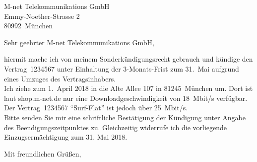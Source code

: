 \documentclass[a4paper, 12pt, KOMAold]{scrlttr2}
\newcommand{\Empfaenger}{M-net Telekommunikations GmbH} %
\newcommand{\EStrasse}{Emmy-Noether-Strasse 2}    %
\newcommand{\EPLZ}{80992}                   %
\newcommand{\EOrt}{München}                 %
\newcommand{\DocTitle}{Sonderkündigung wegen Umzug} %
\begin{document}
    \begin{letter}{\Empfaenger \\ \EStrasse \\ \EPLZ~\EOrt}
    \date{\today}%
    \subject{\DocTitle}
    \opening{Sehr geehrter \Empfaenger,}
    hiermit mache ich von meinem Sonderkündigungsrecht gebrauch und kündige den
    Vertrag~1234567 unter Einhaltung der 3-Monats-Frist zum 31.~Mai aufgrund
    eines Umzuges des Vertragsinhabers.\\

    Ich ziehe zum 1.~April 2018 in die Alte Allee 107 in 81245~München um. Dort
    ist laut shop.m-net.de nur eine Downloadgeschwindigkeit von 18~Mbit/s
    verfügbar. Der Vertrag~1234567 \enquote{Surf-Flat} ist jedoch über 25~Mbit/s.\\


    Bitte senden Sie mir eine schriftliche Bestätigung der Kündigung unter
    Angabe des Beendigungszeitpunktes zu. Gleichzeitig widerrufe ich die
    vorliegende Einzugsermächtigung zum 31. Mai 2018.

    \closing{Mit freundlichen Grüßen,}
    \end{letter}
\end{document}
